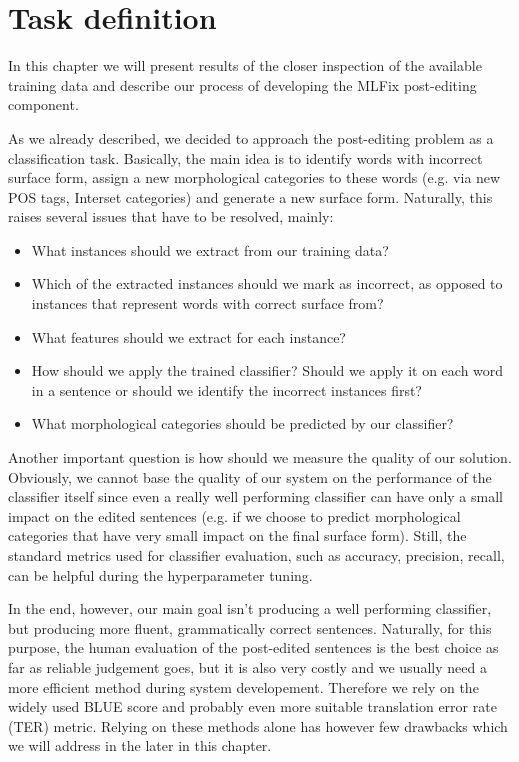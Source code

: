 \chapter{Task definition}

In this chapter we will present results of the closer inspection
of the available training data and describe our process of developing
the MLFix post-editing component.


As we already described, we decided to approach the post-editing problem as a classification
task. Basically, the main idea is to identify words with incorrect surface form,
assign a new morphological categories to these words (e.g. via new POS tags, Interset
categories) and generate a new surface form. Naturally, this raises several issues
that have to be resolved, mainly:
\begin{itemize}
    \item What instances should we extract from our training data?
    \item Which of the extracted instances should we mark as incorrect, as opposed
        to instances that represent words with correct surface from?
    \item What features should we extract for each instance?
    \item How should we apply the trained classifier? Should we apply it
        on each word in a sentence or should we identify the incorrect instances
        first?
    \item What morphological categories should be predicted by our classifier?
\end{itemize}

Another important question is how should we measure the quality of our solution.
Obviously, we cannot base the quality of our system on the performance of the
classifier itself since even a really well performing classifier can have only a small
impact on the edited sentences (e.g. if we choose to predict morphological categories
that have very small impact on the final surface form). Still, the standard metrics
used for classifier evaluation, such as accuracy, precision, recall, can be helpful
during the hyperparameter tuning.

In the end, however, our main goal isn't producing a well performing classifier, but producing
more fluent, grammatically correct sentences.
Naturally, for this purpose, the human evaluation of the post-edited sentences is the best choice as far
as reliable judgement goes, but it is also very costly and we usually need a more efficient
method during system developement. Therefore we rely on the widely used BLUE score and
probably even more suitable translation error rate (TER) metric. Relying on these methods alone
has however few drawbacks which we will address in the later in this chapter.

